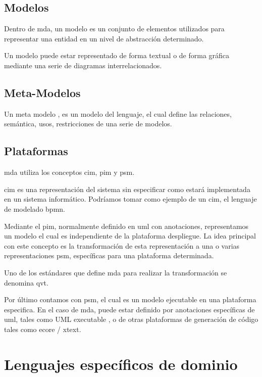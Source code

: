 \subsection{Modelos}

Dentro de \gls{mda}, un modelo es un conjunto de elementos utilizados para representar una entidad en un nivel de abstracción determinado.

Un modelo puede estar representado de forma textual o de forma gráfica mediante una serie de diagramas interrelacionados.

\subsection{Meta-Modelos}
Un meta modelo \cite{mda_distilled_intro}, es un modelo del lenguaje, el cual define las relaciones, semántica, usos, restricciones de una serie de modelos.

\subsection{Plataformas}

\gls{mda} utiliza los conceptos \gls{cim}, \gls{pim} y \gls{psm}. \cite{mda_wirtschaftsinformatik}

\gls{cim} es una representación del sistema sin especificar como estará implementada en un sistema informático. Podríamos tomar como ejemplo de un \gls{cim}, el lenguaje de modelado \gls{bpmn}.

Mediante el \gls{pim}, normalmente definido en \gls{uml} con anotaciones, representamos un modelo el cual es independiente de la plataforma despliegue. La idea principal con este concepto es la transformación de esta representación a una o varias representaciones \gls{psm}, específicas para una plataforma determinada. 

Uno de los estándares que define \gls{mda} para realizar la transformación se denomina \gls{qvt}.

Por último contamos con \gls{psm}, el cual es un modelo ejecutable en una plataforma especifica. En el caso de \gls{mda}, puede estar definido por anotaciones específicas de \gls{uml}, tales como UML executable \cite{uml_executable}, o de otras plataformas de generación de código tales como \gls{ecore} / xtext.


\section{Lenguajes específicos de dominio}

